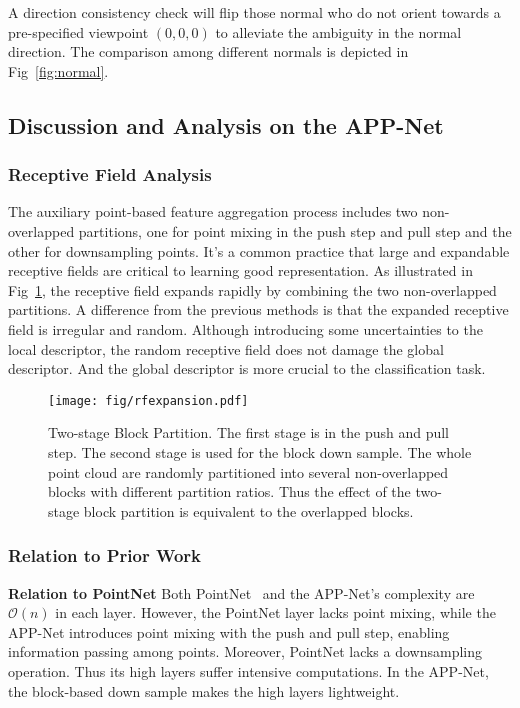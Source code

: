 \documentclass[journal]{IEEEtran}
\begin{document}
A direction consistency check will flip those normal who do not orient towards a pre-specified viewpoint $(0,0,0)$ to alleviate the ambiguity in the normal direction. The comparison among different normals is depicted in Fig~\ref{fig:normal}.

\subsection{Discussion and Analysis on the APP-Net}
\subsubsection{Receptive Field Analysis}

The auxiliary point-based feature aggregation process includes two non-overlapped partitions, one for point mixing in the push step and pull step and the other for downsampling points. It's a common practice that large and expandable receptive fields are critical to learning good representation. As illustrated in Fig~\ref{fig:receptivefield}, the receptive field expands rapidly by combining the two non-overlapped partitions. A difference from the previous methods is that the expanded receptive field is irregular and random. Although introducing some uncertainties to the local descriptor, the random receptive field does not damage the global descriptor. And the global descriptor is more crucial to the classification task.

\begin{figure}[tbp]
\begin{center}
\texttt{[image: fig/rfexpansion.pdf]}
\end{center}
\vspace{-0.5cm}
   \caption{Two-stage Block Partition. The first stage is in the push and pull step. The second stage is used for the block down sample. The whole point cloud are randomly partitioned into several non-overlapped blocks with different partition ratios. Thus the effect of the two-stage block partition is equivalent to the overlapped blocks.}
   \label{fig:receptivefield}
\end{figure}

\subsubsection{Relation to Prior Work}


\noindent
{\bf Relation to PointNet} Both PointNet~\cite{PointNet} and the APP-Net's complexity are $\mathcal{O}(n)$ in each layer. However, the PointNet layer lacks point mixing, while the APP-Net introduces point mixing with the push and pull step, enabling information passing among points. Moreover, PointNet lacks a downsampling operation. Thus its high layers suffer intensive computations. In the APP-Net, the block-based down sample makes the high layers lightweight. 
\end{document}
